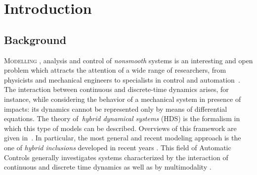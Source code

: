 \chapter{{Introduction}}
\label{chap:introduction}
\minitoc

\thispagestyle{empty}

\newpage



\section{Background}
\lettrine[lines=4]{\color{brickred}M}{odelling} , analysis and control of \textit{nonsmooth} systems is an interesting and open problem which attracts the attention of a wide range of researchers, from physicists and mechanical engineers to specialists in control and automation~\citep{brogliato1999nonsmooth,stronge2018impact}.
The interaction between continuous and discrete-time dynamics arises, for instance, while considering the behavior of a mechanical system in presence of impacts: its dynamics cannot be represented only by means of differential equations. The theory of~\textit{hybrid dynamical systems} (HDS) is the formalism in which this type of models can be described. Overviews of this framework are given in~\citep{van2000introduction,haddad2006impulsive}. In particular, the most general and recent modeling approach is the one of \textit{hybrid inclusions} developed in recent years \citep{goebel2009hybrid}. This field of Automatic Controls generally investigates systems characterized by the interaction of continuous and discrete time dynamics as well as by multimodality \citep{Goebel2012}.
%
\newline

